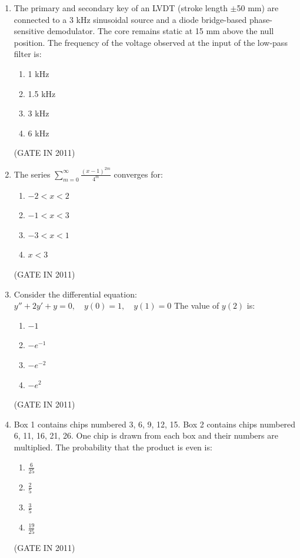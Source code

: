 \documentclass[journal]{IEEEtran}
\begin{document}
\begin{enumerate}
\item The primary and secondary key of an LVDT (stroke length $\pm$50 mm) are connected to a 3 kHz sinusoidal source and a diode bridge-based phase-sensitive demodulator. The core remains static at 15 mm above the null position. The frequency of the voltage observed at the input of the low-pass filter is:
\begin{multicols}{4}
\begin{enumerate}
\item 1 kHz  
\item 1.5 kHz  
\item 3 kHz  
\item 6 kHz
\end{enumerate}
\end{multicols} \hfill(GATE IN 2011)

\item The series  
$\sum_{m=0}^{\infty} \frac{(x-1)^{2m}}{4^m}$  
converges for:
\begin{multicols}{4}
\begin{enumerate}
\item $-2 < x < 2$  
\item $-1 < x < 3$  
\item $-3 < x < 1$  
\item $x < 3$
\end{enumerate}
\end{multicols} \hfill(GATE IN 2011)

\item Consider the differential equation:  
$y'' + 2y' + y = 0,\quad y(0) = 1,\quad y(1) = 0$  
The value of $y(2)$ is:
\begin{multicols}{4}
\begin{enumerate}
\item $-1$  
\item $-e^{-1}$  
\item $-e^{-2}$  
\item $-e^{2}$
\end{enumerate}
\end{multicols} \hfill(GATE IN 2011)

\item Box 1 contains chips numbered 3, 6, 9, 12, 15. Box 2 contains chips numbered 6, 11, 16, 21, 26. One chip is drawn from each box and their numbers are multiplied. The probability that the product is even is:
\begin{multicols}{4}
\begin{enumerate}
\item $\frac{6}{25}$  
\item $\frac{2}{5}$  
\item $\frac{3}{5}$  
\item $\frac{19}{25}$
\end{enumerate}
\end{multicols} \hfill(GATE IN 2011)


\end{enumerate}
\end{document}
